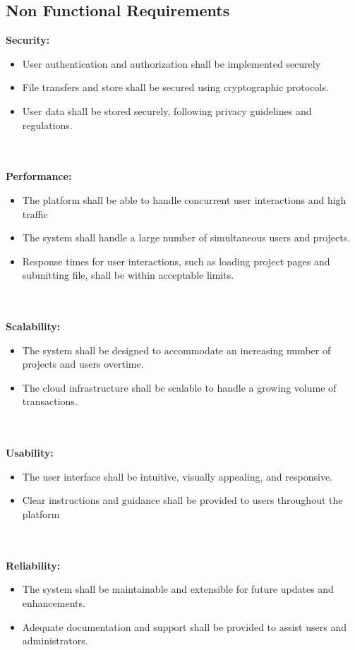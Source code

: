 \subsection{Non Functional Requirements}
\hspace{1.5em}\textbf{Security:}
\begin{itemize}
  \item User authentication and authorization shall be implemented securely
\item File transfers and store shall be secured using cryptographic protocols. 
\item User data shall be stored securely, following privacy guidelines and regulations.    
\end{itemize}
\\
\\
\hspace{1.5em}\textbf{Performance:}
\begin{itemize}
  \item The platform shall be able to handle concurrent user interactions and high traffic 
\item The system shall handle a large number of simultaneous users and projects.
\item Response times for user interactions, such as loading project pages and submitting file, shall be
within acceptable limits.   
\end{itemize}
\\
\\
\hspace{1.5em}\textbf{Scalability:}
\begin{itemize}
  \item The system shall be designed to accommodate an increasing number of projects and users overtime. 
\item The cloud infrastructure shall be scalable to handle a growing volume of transactions.   
\end{itemize}
\\
\\
\hspace{1.5em}\textbf{Usability:}
\begin{itemize}
  \item The user interface shall be intuitive, visually appealing, and responsive. 
\item Clear instructions and guidance shall be provided to users throughout the platform   
\end{itemize}
\\
\\
\hspace{1.5em}\textbf{Reliability:}
\begin{itemize}
  \item The system shall be maintainable and extensible for future updates and enhancements. 
\item Adequate documentation and support shall be provided to assist users and administrators.  
\end{itemize}



